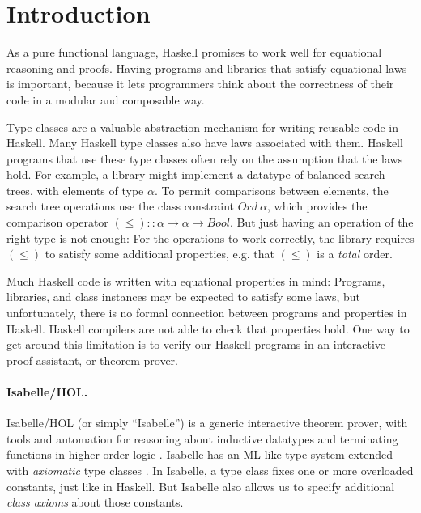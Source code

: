 \documentclass{sigplanconf}
\newcommand{\hsc}[1]{\ensuremath{\mathit{#1}}}
\newcommand{\tA}{\alpha}
\theoremstyle{definition}
\begin{document}

\section{Introduction}

As a pure functional language, Haskell promises to work well for equational reasoning and proofs. Having programs and libraries that satisfy equational laws is important, because it lets programmers think about the correctness of their code in a modular and composable way.

Type classes are a valuable abstraction mechanism for writing reusable code in Haskell. Many Haskell type classes also have laws associated with them. Haskell programs that use these type classes often rely on the assumption that the laws hold. For example, a library might implement a datatype of balanced search trees, with elements of type $\tA$. To permit comparisons between elements, the search tree operations use the class constraint $\hsc{Ord}\:\tA$, which provides the comparison operator $(\le)::\tA\to\tA\to\hsc{Bool}$. But just having an operation of the right type is not enough: For the operations to work correctly, the library requires $(\le)$ to satisfy some additional properties, e.g. that $(\le)$ is a \emph{total} order.

Much Haskell code is written with equational properties in mind: Programs, libraries, and class instances may be expected to satisfy some laws, but unfortunately, there is no formal connection between programs and properties in Haskell. Haskell compilers are not able to check that properties hold. One way to get around this limitation is to verify our Haskell programs in an interactive proof assistant, or theorem prover.

\paragraph{Isabelle/HOL.}

Isabelle/HOL (or simply ``Isabelle'') is a generic interactive theorem prover, with tools and automation for reasoning about inductive datatypes and terminating functions in higher-order logic \cite{isabelle-tutorial}. Isabelle has an ML-like type system extended with \emph{axiomatic} type classes \cite{Wenzel1997}. In Isabelle, a type class fixes one or more overloaded constants, just like in Haskell. But Isabelle also allows us to specify additional \emph{class axioms} about those constants.
\end{document}
